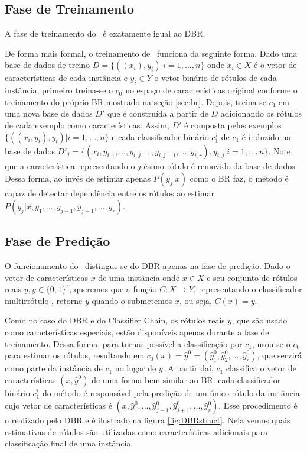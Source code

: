  
 \subsection{Fase de Treinamento}
  A fase de treinamento do \MRLMa~é exatamente igual ao DBR.
  
  De forma mais formal, o treinamento de \MRLM~funciona da seguinte forma.
  Dado uma base de dados de treino $D=\{((x_i),y_i)|i=1,...,n\}$ onde $x_i \in X$ é o vetor de características de cada instância
  e $y_i \in Y$ o vetor binário de rótulos de cada instância,
  primeiro treina-se o $c_0$
  no espaço de características original conforme o treinamento do próprio BR mostrado na seção \ref{sec:br}.
  Depois, treina-se $c_1$ em uma nova base de dados $D'$ que é construída a partir de $D$ adicionando os rótulos de cada
  exemplo como características. Assim, $D'$ é composta pelos exemplos $\{((x_i,y_i),y_i) |i=1,...,n\}$ e
  cada classificador binário $c_1^j$ de $c_1$ é induzido na base de dados $D'_j=\{(x_i,y_{i,1},...,y_{i,j-1},y_{i,j+1},...,y_{i,r}),y_{i,j} | i=1,...,n\}$.
  Note que a característica representando o $j$-ésimo rótulo é removido da base de dados.
  Dessa forma, ao invés de estimar apenas $P(y_j|x)$ como o BR faz, o método é capaz de detectar dependência entre os rótulos ao
  estimar $P(y_j|x,y_1,...,y_{j-1},y_{j+1},...,y_r)$.
 
 \subsection{Fase de Predição}
 \label{sec:mrlm_prediction}
 O funcionamento do \MRLMa~distingue-se do DBR apenas na fase de predição.
 Dado o vetor de características $x$ de uma instância 
 onde $x\in X$ e seu conjunto de rótulos reais $y,y \in {\{0,1\}}^r$, queremos que a função $C:X\rightarrow Y$,
 representando o classificador multirrótulo \MRLMa, retorne $y$ quando o submetemos $x$, ou seja, $C(x)=y$.
 
 Como no caso do DBR e do Classifier Chain, os rótulos reais $y$, que são usado como características especiais,
 estão disponíveis apenas durante a fase de treinamento. Dessa forma, para tornar possível a classificação por $c_1$, usou-se o $c_0$ para
 estimar os rótulos, %
 resultando em $c_0(x)=\hat{y}^0=(\hat{y}_1^0,\hat{y}_2^0,...,\hat{y}_r^0)$, que servirá como parte da instância de $c_1$
 no lugar de $y$. 
A partir daí, $c_1$ classifica o vetor de características $(x,\hat{y}^0)$ de uma forma bem similar ao BR:
 cada classificador binário $c_1^i$ do método é responsável pela predição de um único rótulo da instância
 cujo vetor de características é $(x,\hat{y}_1^0,...,\hat{y}_{j-1}^0,\hat{y}_{j+1}^0,...,\hat{y}_r^0)$. 
 Esse procedimento é o realizado pelo DBR e é ilustrado na figura \ref{fig:DBRstruct}. 
 Nela vemos quais estimativas de rótulos são utilizadas como características adicionais para classificação final
 de uma instância.
 
